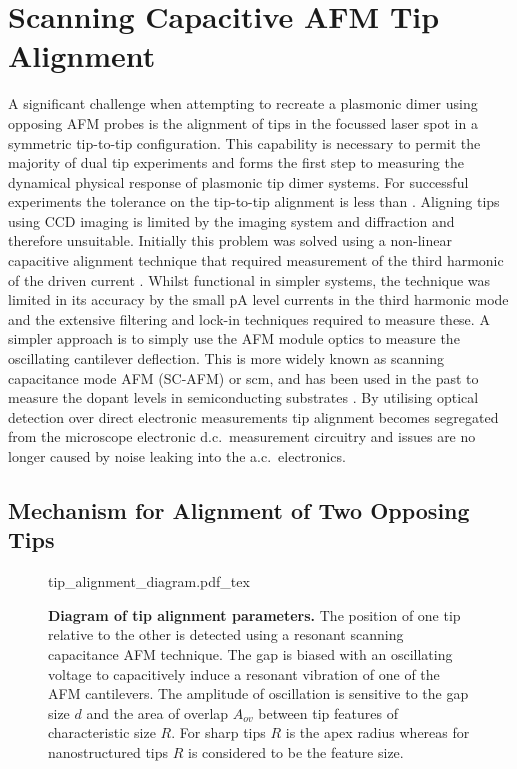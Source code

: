 \documentclass{article}
\begin{document}
\section{Scanning Capacitive AFM Tip Alignment}
\label{sec:tip_alignment}

A significant challenge when attempting to recreate a plasmonic dimer using opposing AFM probes is the alignment of tips in the focussed laser spot in a symmetric tip-to-tip configuration. This capability is necessary to permit the majority of dual tip experiments and forms the first step to measuring the dynamical physical response of plasmonic tip dimer systems. For successful experiments the tolerance on the tip-to-tip alignment is less than . Aligning tips using CCD imaging is limited by the imaging system and diffraction and therefore unsuitable. Initially this problem was solved using a non-linear capacitive alignment technique that required measurement of the third harmonic of the driven current \cite{savage2011}. Whilst functional in simpler systems, the technique was limited in its accuracy by the small pA level currents in the third harmonic mode and the extensive filtering and lock-in techniques required to measure these. A simpler approach is to simply use the AFM module optics to measure the oscillating cantilever deflection. This is more widely known as scanning capacitance mode AFM (SC-AFM) or \gls{scm}, and has been used in the past to measure the dopant levels in semiconducting substrates \cite{matey1985scanning, bugg1988scanning, huang1995quantitative, kopanski1996scanning, girard2001electrostatic}. By utilising optical detection over direct electronic measurements tip alignment becomes segregated from the microscope electronic d.c.\ measurement circuitry and issues are no longer caused by noise leaking into the a.c.\ electronics.

\FloatBarrier
\subsection{Mechanism for Alignment of Two Opposing Tips}

\begin{figure}[bt]
\centering
\fontsize{10pt}{1em}\selectfont
\def\svgwidth{0.65\textwidth}
{tip_alignment_diagram.pdf_tex}
\caption[Diagram of tip alignment parameters]{\textbf{Diagram of tip alignment parameters.} The position of one tip relative to the other is detected using a resonant scanning capacitance AFM technique. The gap is biased with an oscillating voltage to capacitively induce a resonant vibration of one of the AFM cantilevers. The amplitude of oscillation is sensitive to the gap size $d$ and the area of overlap $A_{ov}$ between tip features of characteristic size $R$. For sharp tips $R$ is the apex radius whereas for nanostructured tips $R$ is considered to be the feature size.}
\label{fig:tip_alignment_diagram}
\end{figure}
\end{document}
